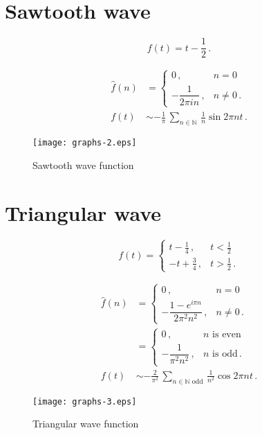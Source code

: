 \documentclass[12pt]{article}
\newcommand{\nat}{\mathbb{N}}
\begin{document}
\section{Sawtooth wave}
\[
f(t) = t - \frac{1}{2}\,.
\]

\begin{makeimage}
\begin{align*}
\widehat{f}(n) &= 
\begin{cases}
0\,, & n=0 \\
-\dfrac{1}{2\pi in}\,, & n \neq 0\,.
\end{cases} 
\\
f(t) &\sim - \frac{1}{\pi} \, \sum_{n \in \nat} \, \frac{1}{n} \sin 2\pi n t\,.
\end{align*}
\end{makeimage}

\begin{figure}[!htb]
\begin{center}
\texttt{[image: graphs-2.eps]}
\end{center}
\caption{Sawtooth wave function}
\end{figure}

\section{Triangular wave}
\[
f(t) = \begin{cases}
t - \frac{1}{4} \,, & t < \frac{1}{2} \\
-t + \frac{3}{4} \,, & t > \frac{1}{2}\,.
\end{cases}
\]

\begin{makeimage}
\begin{align*}
\widehat{f}(n) &= 
\begin{cases}
0\,, & n=0 \\
- \dfrac{1-e^{i\pi n}}{2\pi^2 n^2}\,, & n \neq 0\,.
\end{cases}  \\
&=
\begin{cases}
0\,, & \text{$n$ is even} \\
- \dfrac{1}{\pi^2 n^2}\,, & \text{$n$ is odd}\,.
\end{cases} 
\\
f(t) &\sim - \frac{2}{\pi^2} \, \sum_{n \in \nat \text{ odd}} \, 
\frac{1}{n^2} \cos 2\pi n t\,.
\end{align*}
\end{makeimage}

\begin{figure}[!htb]
\begin{center}
\texttt{[image: graphs-3.eps]}
\end{center}
\caption{Triangular wave function}
\end{figure}
\end{document}
